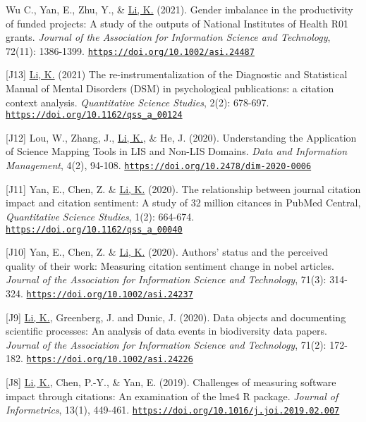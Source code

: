 \documentclass[margin, 10pt]{res} %
\begin{document}
\begin{resume}
[J14] Wu C., Yan, E., Zhu, Y., \& \underline{Li, K.} (2021). Gender imbalance in the productivity of funded projects: A study of the outputs of National Institutes of Health R01 grants. \textit{Journal of the Association for Information Science and Technology}, 72(11): 1386-1399. \href{https://doi.org/10.1002/asi.24487}{\nolinkurl{https://doi.org/10.1002/asi.24487}}

[J13] \underline{Li, K.} (2021) The re-instrumentalization of the Diagnostic and Statistical Manual of Mental Disorders (DSM) in psychological publications: a citation context analysis. \textit{Quantitative Science Studies}, 2(2): 678-697. \href{https://doi.org/10.1162/qss_a_00124}{\nolinkurl{https://doi.org/10.1162/qss_a_00124}}

[J12] Lou, W., Zhang, J., \underline{Li, K.}, \& He, J. (2020). Understanding the Application of Science Mapping Tools in LIS and Non-LIS Domains. \textit{Data and Information Management}, 4(2), 94-108. \href{https://doi.org/10.2478/dim-2020-0006}{\nolinkurl{https://doi.org/10.2478/dim-2020-0006}}

[J11] Yan, E., Chen, Z. \& \underline{Li, K.} (2020). The relationship between journal citation impact and citation sentiment: A study of 32 million citances in PubMed Central, \textit{Quantitative Science Studies}, 1(2): 664-674. \href{https://doi.org/10.1162/qss\_a\_00040}{\nolinkurl{https://doi.org/10.1162/qss_a_00040}}

[J10] Yan, E., Chen, Z. \& \underline{Li, K.} (2020). Authors' status and the perceived quality of their work: Measuring citation sentiment change in nobel articles. \textit{Journal of the Association for Information Science and Technology}, 71(3): 314-324. \href{https://doi.org/10.1002/asi.24237}{\nolinkurl{https://doi.org/10.1002/asi.24237}}

[J9] \underline{Li, K.}, Greenberg, J. and Dunic, J. (2020). Data objects and documenting scientific processes: An analysis of data events in biodiversity data papers. \textit{Journal of the Association for Information Science and Technology}, 71(2): 172-182. \href{https://doi.org/10.1002/asi.24226}{\nolinkurl{https://doi.org/10.1002/asi.24226}}

[J8] \underline{Li, K.}, Chen, P.-Y., \& Yan, E. (2019). Challenges of measuring software impact through citations: An examination of the lme4 R package. \textit{Journal of Informetrics}, 13(1), 449-461. \href{https://doi.org/10.1016/j.joi.2019.02.007}{\nolinkurl{https://doi.org/10.1016/j.joi.2019.02.007}}


\end{resume}
\end{document}
